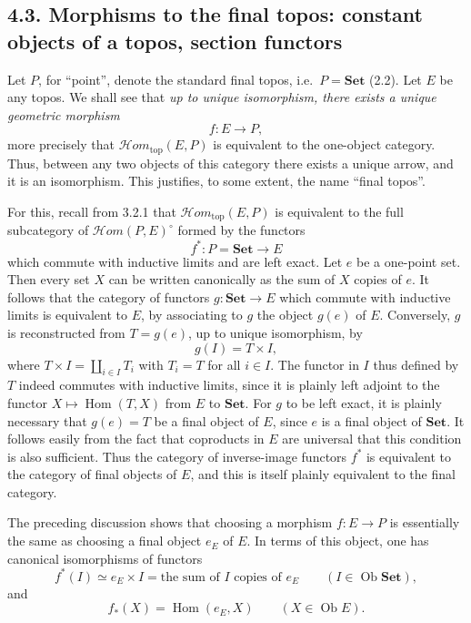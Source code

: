 \documentclass[11pt]{article}
\newcommand{\Set}{\mathbf{Set}}
\newcommand{\Hom}{\operatorname{Hom}}
\newcommand{\Ob}{\operatorname{Ob}}
\newcommand{\Hhom}{\mathcal{H}om}
\newcommand{\Hhomtop}{\mathcal{H}om_{\mathrm{top}}}
\newcommand{\ie}{i.e.}
\providecommand{\Ob}{\operatorname{Ob}}
\begin{document}
\subsection*{4.3. Morphisms to the final topos: constant objects of a topos, section functors}
Let \(P\), for ``point'', denote the standard final topos, \ie\ \(P=\Set\) (2.2). Let \(E\) be any topos. We shall see that \emph{up to unique isomorphism, there exists a unique geometric morphism}
\[
f:E\longrightarrow P,
\]
more precisely that \(\Hhomtop(E,P)\) is equivalent to the one-object category. Thus, between any two objects of this category there exists a unique arrow, and it is an isomorphism. This justifies, to some extent, the name ``final topos''.

For this, recall from 3.2.1 that \(\Hhomtop(E,P)\) is equivalent to the full subcategory of \(\Hhom(P,E)^\circ\) formed by the functors
\[
f^\ast:P=\Set\longrightarrow E
\]
which commute with inductive limits and are left exact. Let \(e\) be a one-point set. Then every set \(X\) can be written canonically as the sum of \(X\) copies of \(e\). It follows that the category of functors \(g:\Set\to E\) which commute with inductive limits is equivalent to \(E\), by associating to \(g\) the object \(g(e)\) of \(E\). Conversely, \(g\) is reconstructed from \(T=g(e)\), up to unique isomorphism, by
\[
g(I)=T\times I,
\]
where \(T\times I=\coprod_{i\in I}T_i\) with \(T_i=T\) for all \(i\in I\). The functor in \(I\) thus defined by \(T\) indeed commutes with inductive limits, since it is plainly left adjoint to the functor \(X\mapsto\Hom(T,X)\) from \(E\) to \(\Set\). For \(g\) to be left exact, it is plainly necessary that \(g(e)=T\) be a final object of \(E\), since \(e\) is a final object of \(\Set\). It follows easily from the fact that coproducts in \(E\) are universal that this condition is also sufficient. Thus the category of inverse-image functors \(f^\ast\) is equivalent to the category of final objects of \(E\), and this is itself plainly equivalent to the final category.

The preceding discussion shows that choosing a morphism \(f:E\to P\) is essentially the same as choosing a final object \(e_E\) of \(E\). In terms of this object, one has canonical isomorphisms of functors
\[
f^\ast(I)\simeq e_E\times I
=\text{the sum of }I\text{ copies of }e_E
\qquad(I\in\Ob\Set),\tag{4.3.2}
\]
and
\[
f_\ast(X)=\Hom(e_E,X)
\qquad(X\in\Ob E).\tag{4.3.3}
\]
\end{document}
